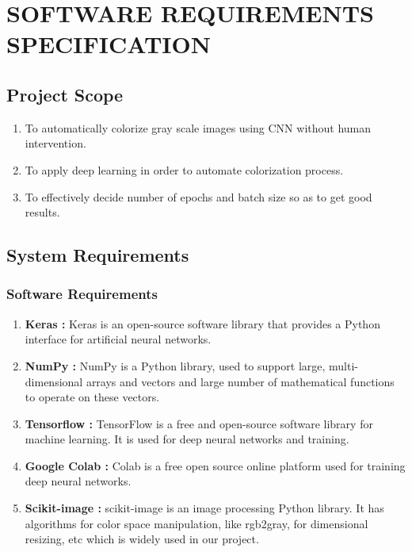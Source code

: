 \documentclass[12pt]{report}	%
\begin{document}
\chapter{SOFTWARE REQUIREMENTS SPECIFICATION}

\section{Project Scope}
\begin{enumerate}
\item To automatically colorize gray scale images using CNN without human intervention. 
\item To apply deep learning in order to automate colorization process.
\item To effectively decide number of epochs and batch size so as to get good results.
\end{enumerate}


\section{System Requirements }
\subsection{Software Requirements}
\begin{enumerate}
	\item{\bf Keras :} Keras is an open-source software library that provides a Python interface for artificial neural networks.
	
	\item{\bf NumPy :} NumPy is a  Python library, used to support large, multi-dimensional arrays and vectors and large number of  mathematical functions to operate on these vectors.
	
	\item{\bf Tensorflow :} TensorFlow is a free and open-source software library for machine learning. It is used for deep neural networks and training.
	
    \item {\bf Google Colab :} Colab is a free open source online platform used for training deep neural networks.
    
    \item {\bf Scikit-image :} scikit-image is an  image processing Python library. It has algorithms for color space manipulation, like rgb2gray, for dimensional resizing, etc which is widely used in our project.
	
\end{enumerate}
\end{document}
